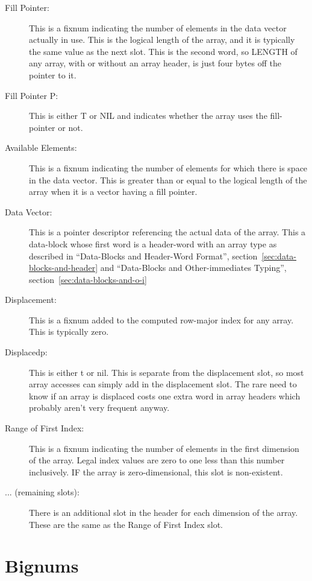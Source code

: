 \begin{description}
   \item[Fill Pointer:]
      This is a fixnum indicating the number of elements in the data vector
      actually in use.  This is the logical length of the array, and it is
      typically the same value as the next slot.  This is the second word, so
      LENGTH of any array, with or without an array header, is just four bytes
      off the pointer to it.
   \item[Fill Pointer P:]
      This is either T or NIL and indicates whether the array uses the
      fill-pointer or not.
   \item[Available Elements:]
      This is a fixnum indicating the number of elements for which there is
      space in the data vector.  This is greater than or equal to the logical
      length of the array when it is a vector having a fill pointer.
   \item[Data Vector:]
      This is a pointer descriptor referencing the actual data of the array.
      This a data-block whose first word is a header-word with an array type as
      described in ``Data-Blocks and Header-Word Format'', section~\ref{sec:data-blocks-and-header} and
      ``Data-Blocks and Other-immediates Typing'', section~\ref{sec:data-blocks-and-o-i}
   \item[Displacement:]
      This is a fixnum added to the computed row-major index for any array.
      This is typically zero.
   \item[Displacedp:]
      This is either t or nil.  This is separate from the displacement slot, so
      most array accesses can simply add in the displacement slot.  The rare
      need to know if an array is displaced costs one extra word in array
      headers which probably aren't very frequent anyway.
   \item[Range of First Index:]
      This is a fixnum indicating the number of elements in the first dimension
      of the array.  Legal index values are zero to one less than this number
      inclusively.  IF the array is zero-dimensional, this slot is
      non-existent.
   \item[... (remaining slots):]
      There is an additional slot in the header for each dimension of the
      array.  These are the same as the Range of First Index slot.
\end{description}


\section{Bignums}

